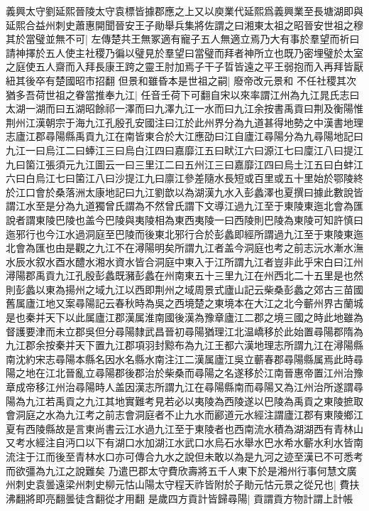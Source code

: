 義興太守劉延熙晉陵太守袁標皆據郡應之上又以庾業代延熙爲義興業至長塘湖即與延熙合益州刺史蕭惠開聞晉安王子勛舉兵集將佐謂之曰湘東太祖之昭晉安世祖之穆其於當璧並無不可|{
	左傳楚共王無冢適有寵子五人無適立焉乃大有事於羣望而祈曰請神擇於五人使主社稷乃徧以璧見於羣望曰當璧而拜者神所立也既乃密埋璧於太室之庭使五人齋而入拜長康王跨之靈王肘加焉子干子晢皆遠之平王弱抱而入再拜皆厭紐其後卒有楚國昭市招翻}
但景和雖昏本是世祖之嗣|{
	廢帝改元景和}
不任社稷其次猶多吾荷世祖之眷當推奉九江|{
	任音壬荷下可翻自宋以來率謂江州為九江晁氏志曰太湖一湖而曰五湖昭餘祁一澤而曰九澤九江一水而曰九江余按書禹貢曰荆及衡陽惟荆州江漢朝宗于海九江孔殷孔安國注曰江於此州界分為九道甚得地勢之中漢書地理志廬江郡尋陽縣禹貢九江在南皆東合於大江應劭曰江自廬江尋陽分為九尋陽地記曰九江一曰烏江二曰蜯江三曰烏白江四曰嘉靡江五曰畎江六曰源江七曰廩江八曰提江九曰箘江張須元九江圖云一曰三里江二曰五州江三曰嘉靡江四曰烏土江五曰白蚌江六曰白烏江七曰箘江八曰沙提江九曰廪江參差隨水長短或百里或五十里始於鄂陵終於江口會於桑落洲太康地記曰九江劉歆以為湖漢九水入彭蠡澤也夏撰曰據此數說皆謂江水至是分為九道獨曾氏謂為不然曾氏謂下文導江過九江至于東陵東迤北會為匯說者謂東陵巴陵也盖今巴陵與夷陵相為東西夷陵一曰西陵則巴陵為東陵可知許慎曰迤邪行也今江水過洞庭至巴陵而後東北邪行合於彭蠡即經所謂過九江至于東陵東迤北會為匯也由是觀之九江不在潯陽明矣所謂九江者盖今洞庭也考之前志沅水漸水潕水辰水叙水酉水醴水湘水資水皆合洞庭中東入于江所謂九江者豈非此乎宋白曰江州潯陽郡禹貢九江孔殷彭蠡既瀦彭蠡在州南東五十三里九江在州西北二十五里是也然則彭蠡以東為揚州之域九江以西即荆州之域周景式廬山記云柴桑彭蠡之郊古三苗國舊属廬江地又案尋陽記云春秋時為吳之西境楚之東境本在大江之北今蘄州界古蘭城是也秦并天下以此属廬江郡漢属淮南國後漢為豫章廬江二郡之境三國之時此地雖為督護要津而未立郡吳但分尋陽隸武昌晉初尋陽猶理江北温嶠移於此始置尋陽郡隋為九江郡余按秦并天下置九江郡項羽封黥布為九江王都六漢地理志所謂九江在潯陽縣南沈約宋志尋陽本縣名因水名縣水南注江二漢属廬江吳立蘄春郡尋陽縣属焉此時尋陽之地在江北晉亂立尋陽郡後郡治於柴桑而尋陽之名遂移於江南晉惠帝置江州治豫章成帝移江州治尋陽時人盖因漢志所謂九江在尋陽縣南而尋陽又為江州治所遂謂尋陽為九江若禹貢之九江其地實難考見若必以夷陵為西陵遂以巴陵為禹貢之東陵摭取會洞庭之水為九江考之前志會洞庭者不止九水而酈道元水經注謂廬江郡有東陵鄉江夏有西陵縣故是言東尚書云江水過九江至于東陵者也西南流水積為湖湖西有青林山又考水經注自沔口以下有湖口水加湖江水武口水烏石水舉水巴水希水蘄水利水皆南流注于江而後至青林水口亦可傳合九水之說但未敢以為是九河之迹至漢已不可悉考而欲彊為九江之說難矣}
乃遣巴郡太守費欣壽將五千人東下於是湘州行事何慧文廣州刺史袁曇遠梁州刺史柳元怙山陽太守程天祚皆附於子勛元怙元景之從兄也|{
	費扶沸翻將即亮翻曇徒含翻從才用翻}
是歲四方貢計皆歸尋陽|{
	貢謂貢方物計謂上計帳}
